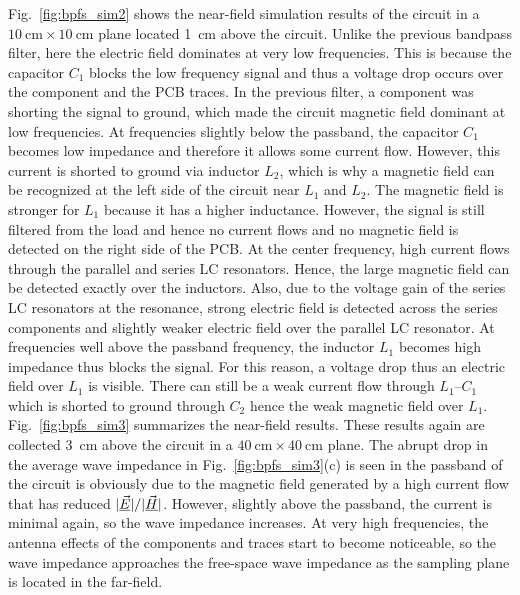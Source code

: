 Fig.~\ref{fig:bpfs_sim2} shows the near-field simulation results of the circuit in a $\SI{10}{\centi\meter} \times \SI{10}{\centi\meter}$ plane located \SI{1}{\centi\meter} above the circuit. Unlike the previous bandpass filter, here the electric field dominates at very low frequencies. This is because the capacitor $C_1$ blocks the low frequency signal and thus a voltage drop occurs over the component and the PCB traces. In the previous filter, a component was shorting the signal to ground, which made the circuit magnetic field dominant at low frequencies. At frequencies slightly below the passband, the capacitor $C_1$ becomes low impedance and therefore it allows some current flow. However, this current is shorted to ground via inductor $L_2$, which is why a magnetic field can be recognized at the left side of the circuit near $L_1$ and $L_2$. The magnetic field is stronger for $L_1$ because it has a higher inductance. However, the signal is still filtered from the load and hence no current flows and no magnetic field is detected on the right side of the PCB. At the center frequency, high current flows through the parallel and series LC resonators. Hence, the large magnetic field can be detected exactly over the inductors. Also, due to the voltage gain of the series LC resonators at the resonance, strong electric field is detected across the series components and slightly weaker electric field over the parallel LC resonator. At frequencies well above the passband frequency, the inductor $L_1$ becomes high impedance thus blocks the signal. For this reason, a voltage drop thus an electric field over $L_1$ is visible. There can still be a weak current flow through $L_1$--$C_1$ which is shorted to ground through $C_2$ hence the weak magnetic field over $L_1$. Fig.~\ref{fig:bpfs_sim3} summarizes the near-field results. These results again are collected \SI{3}{\centi\meter} above the circuit in a $\SI{40}{\centi\meter} \times \SI{40}{\centi\meter}$ plane. The abrupt drop in the average wave impedance in Fig.~\ref{fig:bpfs_sim3}(c) is seen in the passband of the circuit is obviously due to the magnetic field generated by a high current flow that has reduced $\lvert\underline{\vec{E}}\rvert/\lvert\underline{\vec{H}}\rvert$. However, slightly above the passband, the current is minimal again, so the wave impedance increases. At very high frequencies, the antenna effects of the components and traces start to become noticeable, so the wave impedance approaches the free-space wave impedance as the sampling plane is located in the far-field.
\FloatBarrier
